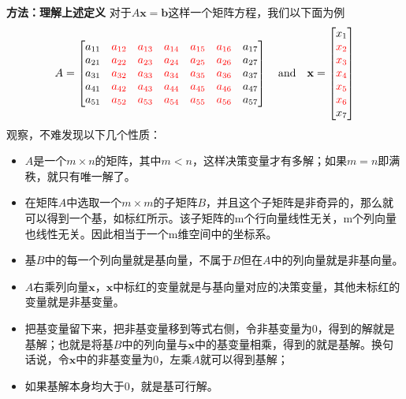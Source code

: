     \begin{notebox}{\textbf{方法：理解上述定义}}
        对于$A\mathbf{x}=\mathbf{b}$这样一个矩阵方程，我们以下面为例
        \[
            A = \begin{bmatrix}
            a_{11} & \textcolor{red}{a_{12}} & \textcolor{red}{a_{13}} & \textcolor{red}{a_{14}} & \textcolor{red}{a_{15}} & \textcolor{red}{a_{16}} & a_{17} \\
            a_{21} & \textcolor{red}{a_{22}} & \textcolor{red}{a_{23}} & \textcolor{red}{a_{24}} & \textcolor{red}{a_{25}} & \textcolor{red}{a_{26}} & a_{27} \\
            a_{31} & \textcolor{red}{a_{32}} & \textcolor{red}{a_{33}} & \textcolor{red}{a_{34}} & \textcolor{red}{a_{35}} & \textcolor{red}{a_{36}} & a_{37} \\
            a_{41} & \textcolor{red}{a_{42}} & \textcolor{red}{a_{43}} & \textcolor{red}{a_{44}} & \textcolor{red}{a_{45}} & \textcolor{red}{a_{46}} & a_{47} \\
            a_{51} & \textcolor{red}{a_{52}} & \textcolor{red}{a_{53}} & \textcolor{red}{a_{54}} & \textcolor{red}{a_{55}} & \textcolor{red}{a_{56}} & a_{57}
            \end{bmatrix}
            \quad
            \text{and}
            \quad
            \mathbf{x} =
            \begin{bmatrix}
            x_1 \\
            \textcolor{red}{x_2} \\
            \textcolor{red}{x_3} \\
            \textcolor{red}{x_4} \\
            \textcolor{red}{x_5} \\
            \textcolor{red}{x_6} \\
            x_7\\
            \end{bmatrix}
            \]
        观察，不难发现以下几个性质：
        \begin{itemize}
            \item $A$是一个$m \times n$的矩阵，其中$m<n$，这样决策变量才有多解；如果$m=n$即满秩，就只有唯一解了。
            \item 在矩阵$A$中选取一个$m \times m$的子矩阵$B$，并且这个子矩阵是非奇异的，那么就可以得到一个基，如标红所示。该子矩阵的m个行向量线性无关，m个列向量也线性无关。因此相当于一个m维空间中的坐标系。
            \item 基$B$中的每一个列向量就是基向量，不属于$B$但在$A$中的列向量就是非基向量。
            \item $A$右乘列向量$\mathbf{x}$，$\mathbf{x}$中标红的变量就是与基向量对应的决策变量，其他未标红的变量就是非基变量。
            \item 把基变量留下来，把非基变量移到等式右侧，令非基变量为0，得到的解就是基解；也就是将基$B$中的列向量与$\mathbf{x}$中的基变量相乘，得到的就是基解。换句话说，令$\mathbf{x}$中的非基变量为0，左乘$A$就可以得到基解；
            \item 如果基解本身均大于0，就是基可行解。
        \end{itemize}
    \end{notebox}
